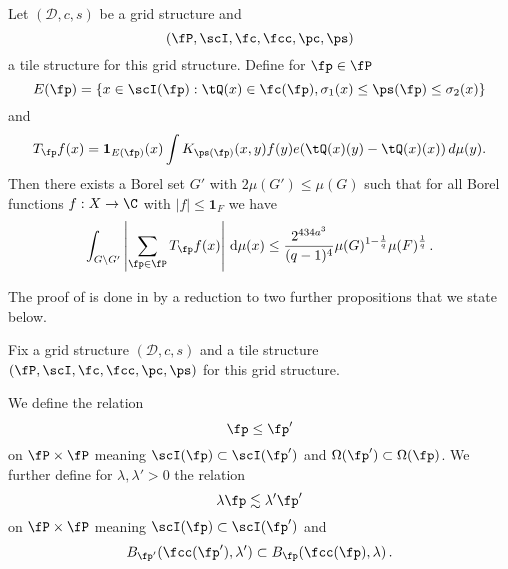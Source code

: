 \begin{proposition}
\label{discrete-Carleson}
\leanok
{}
Let $(\mathcal{D}, c, s)$ be a grid structure and
\begin{equation*}
    (\fP,\scI,\fc,\fcc,\pc,\ps)
\end{equation*}
a tile structure for this grid structure.
Define for $\fp\in \fP$
\begin{equation}\label{defineep}
    E(\fp)=\{x\in \scI(\fp): \tQ(x)\in \fc(\fp) , {\sigma_1}(x)\le \ps(\fp)\le {\sigma_2}(x)\}
\end{equation}
and
\begin{equation}\label{definetp}
    T_{\fp} f(x)= \mathbf{1}_{E(\fp)}(x) \int K_{\ps(\fp)}(x,y) f(y) e(\tQ(x)(y)-\tQ(x)(x))\, d\mu(y).
\end{equation}
Then there exists a Borel set $G'$ with $2\mu(G') \leq \mu(G)$ such that for all Borel functions $f:X\to \C$ with $|f|\le \mathbf{1}_F$
we have
\begin{equation}
    \label{disclesssim}
   \int_{G \setminus G'} \left| \sum_{\fp \in \fP} T_{\fp} f (x) \right| \, \mathrm{d}\mu(x) \le \frac{2^{434a^3}}{(q-1)^4} \mu(G)^{1-\frac{1}{q}} \mu(F)^{\frac{1}{q}}\,.
\end{equation}
\end{proposition}









The proof of  is done in 
by a reduction to two further propositions that we state below.


Fix a grid structure $(\mathcal{D}, c, s)$ and a tile structure $(\fP,\scI,\fc,\fcc,\pc,\ps)$
for this grid structure.

We define the relation
\begin{equation}\label{straightorder}
    \fp\le \fp'
\end{equation}
 on $\fP\times \fP$ meaning
$\scI(\fp)\subset \scI(\fp')$ and
$\Omega(\fp')\subset \Omega(\fp)$.
We further define for $\lambda,\lambda' >0$
the relation
\begin{equation}\label{wiggleorder}
    \lambda \fp \lesssim \lambda' \fp'
\end{equation}
on $\fP\times \fP$ meaning
$\scI(\fp)\subset \scI(\fp')$ and
\begin{equation}
    B_{\fp'}(\fcc(\fp'),\lambda') \subset B_{\fp}(\fcc(\fp),\lambda)\, .
\end{equation}



